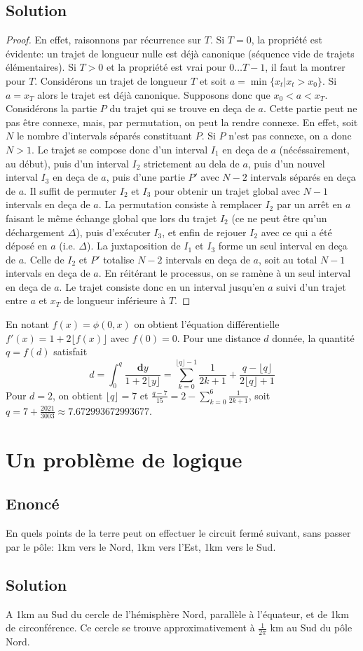 \documentclass{article}
\newenvironment{statement}{\subsection{Enoncé}}{\pagebreak}
\newenvironment{solution}{\subsection{Solution}}{\pagebreak}
\begin{document}
\begin{solution}
\begin{proof}
En effet, raisonnons par récurrence sur $T$. Si $T=0$, la propriété est évidente: un trajet de longueur nulle est déjà canonique (séquence vide de trajets élémentaires). Si $T>0$ et la propriété est vrai pour $0\ldots T-1$, il faut la montrer pour $T$. Considérons un trajet de longueur $T$ et soit $a=\min\{x_t|x_t>x_0\}$. Si $a=x_T$ alors le trajet est déjà canonique. Supposons donc que $x_0<a<x_T$. Considérons la partie $P$ du trajet qui se trouve en deça de $a$. Cette partie peut ne pas être connexe, mais, par permutation, on peut la rendre connexe. En effet, soit $N$ le nombre d'intervals séparés constituant $P$. Si $P$ n'est pas connexe, on a donc $N>1$. Le trajet se compose donc d'un interval $I_1$ en deça de $a$ (nécéssairement, au début), puis d'un interval $I_2$ strictement au dela de $a$, puis d'un nouvel interval $I_3$ en deça de $a$, puis d'une partie $P'$ avec $N-2$ intervals séparés en deça de $a$. Il suffit de permuter $I_2$ et $I_3$ pour obtenir un trajet global avec $N-1$ intervals en deça de $a$. La permutation consiste à remplacer $I_2$ par un arrêt en $a$ faisant le même échange global que lors du trajet $I_2$ (ce ne peut être qu'un déchargement $\Delta$), puis d'exécuter $I_3$, et enfin de rejouer $I_2$ avec ce qui a été déposé en $a$ (i.e. $\Delta$). La juxtaposition de $I_1$ et $I_3$ forme un seul interval en deça de $a$. Celle de $I_2$ et $P'$ totalise $N-2$ intervals en deça de $a$, soit au total $N-1$ intervals en deça de $a$. En réitérant le processus, on se ramène à un seul interval en deça de $a$. Le trajet consiste donc en un interval jusqu'en $a$ suivi d'un trajet entre $a$ et $x_T$ de longueur inférieure à $T$.
\end{proof}
En notant $f(x)=\phi(0,x)$ on obtient l'équation différentielle $f'(x)=1+2\lfloor f(x)\rfloor$ avec $f(0)=0$. Pour une distance $d$ donnée, la quantité $q=f(d)$ satisfait
\[
d = \int_0^q\frac{\mathbf{d}y}{1+2\lfloor y\rfloor} =
\sum_{k=0}^{\lfloor q\rfloor-1}\frac{1}{2k+1}+\frac{q-\lfloor q\rfloor}{2\lfloor q\rfloor+1}
\]
Pour $d=2$, on obtient $\lfloor q\rfloor=7$ et $\frac{q-7}{15}=2-\sum_{k=0}^{6}\frac{1}{2k+1}$, soit $q=7+\frac{2021}{3003}\approx7.672993672993677$.
\end{solution}

\section{Un problème de logique}
\begin{statement}
En quels points de la terre peut on effectuer le circuit fermé suivant, sans passer par le pôle: 1km vers le Nord, 1km vers l'Est, 1km vers le Sud.
\end{statement}
\begin{solution}
A 1km au Sud du cercle de l'hémisphère Nord, parallèle à l'équateur, et de 1km de circonférence. Ce cercle se trouve approximativement à $\frac{1}{2\pi}$ km au Sud du pôle Nord.
\end{solution}
\end{document}

